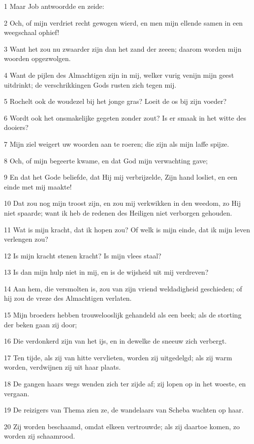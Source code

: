 \par 1 Maar Job antwoordde en zeide:
\par 2 Och, of mijn verdriet recht gewogen wierd, en men mijn ellende samen in een weegschaal ophief!
\par 3 Want het zou nu zwaarder zijn dan het zand der zeeen; daarom worden mijn woorden opgezwolgen.
\par 4 Want de pijlen des Almachtigen zijn in mij, welker vurig venijn mijn geest uitdrinkt; de verschrikkingen Gods rusten zich tegen mij.
\par 5 Rochelt ook de woudezel bij het jonge gras? Loeit de os bij zijn voeder?
\par 6 Wordt ook het onsmakelijke gegeten zonder zout? Is er smaak in het witte des dooiers?
\par 7 Mijn ziel weigert uw woorden aan te roeren; die zijn als mijn laffe spijze.
\par 8 Och, of mijn begeerte kwame, en dat God mijn verwachting gave;
\par 9 En dat het Gode beliefde, dat Hij mij verbrijzelde, Zijn hand losliet, en een einde met mij maakte!
\par 10 Dat zou nog mijn troost zijn, en zou mij verkwikken in den weedom, zo Hij niet spaarde; want ik heb de redenen des Heiligen niet verborgen gehouden.
\par 11 Wat is mijn kracht, dat ik hopen zou? Of welk is mijn einde, dat ik mijn leven verlengen zou?
\par 12 Is mijn kracht stenen kracht? Is mijn vlees staal?
\par 13 Is dan mijn hulp niet in mij, en is de wijsheid uit mij verdreven?
\par 14 Aan hem, die versmolten is, zou van zijn vriend weldadigheid geschieden; of hij zou de vreze des Almachtigen verlaten.
\par 15 Mijn broeders hebben trouwelooslijk gehandeld als een beek; als de storting der beken gaan zij door;
\par 16 Die verdonkerd zijn van het ijs, en in dewelke de sneeuw zich verbergt.
\par 17 Ten tijde, als zij van hitte vervlieten, worden zij uitgedelgd; als zij warm worden, verdwijnen zij uit haar plaats.
\par 18 De gangen haars wegs wenden zich ter zijde af; zij lopen op in het woeste, en vergaan.
\par 19 De reizigers van Thema zien ze, de wandelaars van Scheba wachten op haar.
\par 20 Zij worden beschaamd, omdat elkeen vertrouwde; als zij daartoe komen, zo worden zij schaamrood.
